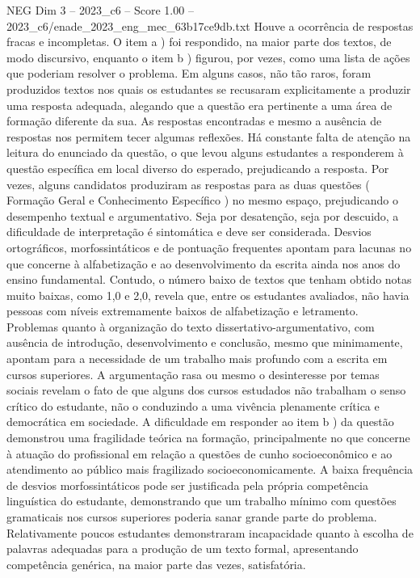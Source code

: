 \begin{textsample}{NEG Dim 3 – 2023\_c6 – Score 1.00 – 2023\_c6/enade\_2023\_eng\_mec\_63b17ce9db.txt}
Houve a ocorrência de respostas fracas e incompletas.
O item a ) foi respondido, na maior parte dos textos, de modo discursivo, enquanto o item b ) figurou, por vezes, como uma lista de ações que poderiam resolver o problema.
Em alguns casos, não tão raros, foram produzidos textos nos quais os estudantes se recusaram explicitamente a produzir uma resposta adequada, alegando que a questão era pertinente a uma área de formação diferente da sua.
As respostas encontradas e mesmo a ausência de respostas nos permitem tecer algumas reflexões.
Há constante falta de atenção na leitura do enunciado da questão, o que levou alguns estudantes a responderem à questão específica em local diverso do esperado, prejudicando a resposta.
Por vezes, alguns candidatos produziram as respostas para as duas questões ( Formação Geral e Conhecimento Específico ) no mesmo espaço, prejudicando o desempenho textual e argumentativo.
Seja por desatenção, seja por descuido, a dificuldade de interpretação é sintomática e deve ser considerada.
Desvios ortográficos, morfossintáticos e de pontuação frequentes apontam para lacunas no que concerne à alfabetização e ao desenvolvimento da escrita ainda nos anos do ensino fundamental.
Contudo, o número baixo de textos que tenham obtido notas muito baixas, como 1,0 e 2,0, revela que, entre os estudantes avaliados, não havia pessoas com níveis extremamente baixos de alfabetização e letramento.
Problemas quanto à organização do texto dissertativo-argumentativo, com ausência de introdução, desenvolvimento e conclusão, mesmo que minimamente, apontam para a necessidade de um trabalho mais profundo com a escrita em cursos superiores.
A argumentação rasa ou mesmo o desinteresse por temas sociais revelam o fato de que alguns dos cursos estudados não trabalham o senso crítico do estudante, não o conduzindo a uma vivência plenamente crítica e democrática em sociedade.
A dificuldade em responder ao item b ) da questão demonstrou uma fragilidade teórica na formação, principalmente no que concerne à atuação do profissional em relação a questões de cunho socioeconômico e ao atendimento ao público mais fragilizado socioeconomicamente.
A baixa frequência de desvios morfossintáticos pode ser justificada pela própria competência linguística do estudante, demonstrando que um trabalho mínimo com questões gramaticais nos cursos superiores poderia sanar grande parte do problema.
Relativamente poucos estudantes demonstraram incapacidade quanto à escolha de palavras adequadas para a produção de um texto formal, apresentando competência genérica, na maior parte das vezes, satisfatória.

\end{textsample}
